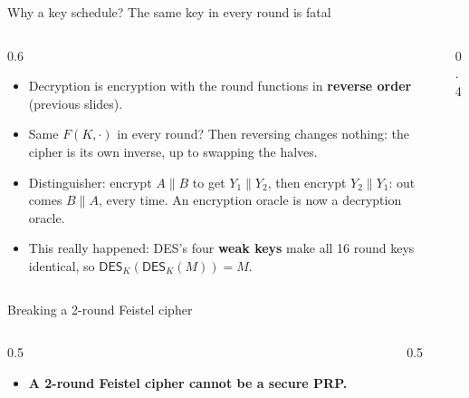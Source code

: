 \ifdefined\PRESENTATION\else\PassOptionsToClass{handout}{beamer}\fi\documentclass[aspectratio=169, lualatex]{beamer}
\begin{document}
\begin{frame}{Why a key schedule? The same key in every round is fatal}
	\begin{columns}[c]
		\begin{column}{0.6\textwidth}
			\begin{itemize}
				\item Decryption is encryption with the round functions in \textbf{reverse order} (previous slides).
				\item Same $F(K, \cdot)$ in every round? Then reversing changes nothing: the cipher is its own inverse, up to swapping the halves.
				\item Distinguisher: encrypt $A\|B$ to get $Y_1\|Y_2$, then encrypt $Y_2\|Y_1$: out comes $B\|A$, every time. An encryption oracle is now a decryption oracle.
				\item This really happened: DES's four \textbf{weak keys} make all 16 round keys identical, so $\mathsf{DES}_K(\mathsf{DES}_K(M)) = M$.
			\end{itemize}
		\end{column}
		\begin{column}{0.4\textwidth}
			\begin{center}
			\end{center}
		\end{column}
	\end{columns}
\end{frame}

\begin{frame}{Breaking a 2-round Feistel cipher}
	\begin{columns}[c]
		\begin{column}{0.5\textwidth}
			\begin{itemize}
				\item \textbf{A 2-round Feistel cipher cannot be a secure PRP.}
			\end{itemize}
		\end{column}
		\begin{column}{0.5\textwidth}
			\begin{center}
			\end{center}
		\end{column}
	\end{columns}
\end{frame}
\end{document}
